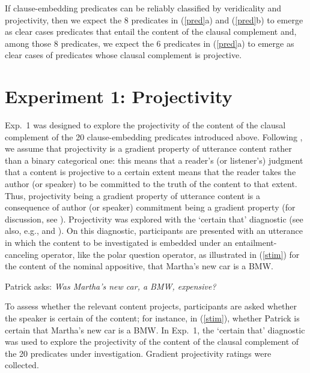 \documentclass[11pt,fleqn]{article}
\newcommand{\6}{\mbox{$[\hspace*{-.6mm}[$}}
\newcommand{\9}{\mbox{$]\hspace*{-.6mm}]$}}
\begin{document}
If clause-embedding predicates can be reliably classified by veridicality and projectivity, then we expect the 8 predicates in (\ref{pred}a) and (\ref{pred}b) to emerge as clear cases predicates that entail the content of the clausal complement and, among those 8 predicates, we expect the 6 predicates in (\ref{pred}a) to emerge as clear cases of predicates whose clausal complement is projective.

\section{Experiment 1: Projectivity}\label{s2}

Exp.~1 was designed to explore the projectivity of the content of the clausal complement of the 20 clause-embedding predicates introduced above. Following \citealt{tbd-variability}, we assume that projectivity is a gradient property of utterance content rather than a binary categorical one:  this means that a reader's (or listener's) judgment that a content is projective to a certain extent means that the reader takes the author (or speaker) to be committed to the truth of the content to that extent. Thus, projectivity being a gradient property of utterance content is a consequence of author (or speaker) commitment being a gradient property (for discussion, see \citealt{tbd-variability}). Projectivity was explored with the `certain that' diagnostic (see also, e.g., \citealt{tonhauser-salt26,djaerv-bacovcin-salt27,stevens-etal2017} and \citealt{tbd-variability}). On this diagnostic, participants are presented with an utterance in which the content to be investigated is embedded under an entailment-canceling operator, like the polar question operator, as illustrated in (\ref{stim}) for the content of the nominal appositive, that Martha's new car is a BMW.

\begin{exe}

\ex\label{stim} Patrick asks: {\em Was Martha's new car, a BMW, expensive?} 

\end{exe}
To assess whether the relevant content projects, participants are asked whether the speaker is certain of the content; for instance, in (\ref{stim}), whether Patrick is certain that Martha's new car is a BMW. In Exp.~1, the `certain that' diagnostic was used to explore the projectivity of the content of the clausal complement of the 20 predicates under investigation. Gradient projectivity ratings were collected.
\end{document}
